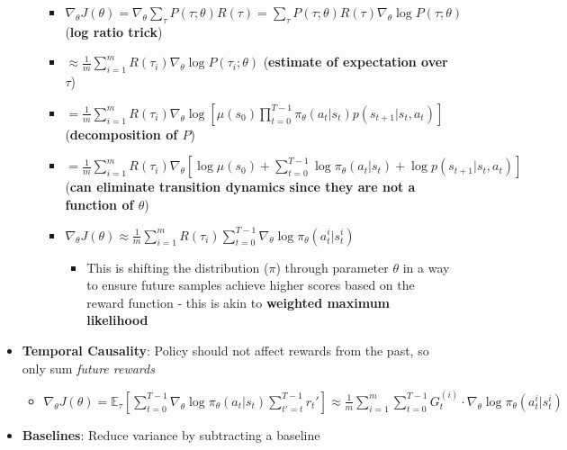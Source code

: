 \documentclass{article}
\providecommand{\tightlist}{%
  \setlength{\itemsep}{\GlobalItemSep}\setlength{\parskip}{\GlobalListParSkip}}
\newlength{\GlobalItemSep}
\newlength{\GlobalListParSkip}
\begin{document}
\begin{multicols}{2}
\begin{itemize}
\begin{itemize}
    \begin{itemize}
    \tightlist
    \item
      \(\nabla_\theta J(\theta) = \nabla_\theta \sum_\tau P(\tau ; \theta) R(\tau) = \sum_\tau P(\tau; \theta) R(\tau) \nabla_\theta \log P(\tau; \theta)\)
      (\textbf{log ratio trick})
    \item
      \(\approx \frac{1}{m}\sum_{i=1}^m R(\tau_i) \nabla_\theta \log P(\tau_i; \theta)\)
      (\textbf{estimate of expectation over \(\tau\)})
    \item
      \(= \frac{1}{m}\sum_{i=1}^m R(\tau_i) \nabla_\theta \log [\mu(s_0) \prod_{t=0}^{T-1} \pi_\theta (a_t | s_t) p(s_{t+1} | s_t, a_t)]\)
      (\textbf{decomposition of \(P\)})
    \item
      \(= \frac{1}{m}\sum_{i=1}^m R(\tau_i) \nabla_\theta [\log \mu(s_0) + \sum_{t=0}^{T-1} \log \pi_\theta (a_t | s_t) + \log p(s_{t+1} | s_t, a_t)]\)
      (\textbf{can eliminate transition dynamics since they are not a
      function of \(\theta\)})
    \item
      \(\nabla_\theta J(\theta) \approx \frac{1}{m} \sum_{i=1}^m R(\tau_i) \sum_{t=0}^{T-1} \nabla_\theta \log \pi_\theta (a^i_t | s^i_t)\)

      \begin{itemize}
      \tightlist
      \item
        This is shifting the distribution (\(\pi\)) through parameter
        \(\theta\) in a way to ensure future samples achieve higher
        scores based on the reward function - this is akin to
        \textbf{weighted maximum likelihood}
      \end{itemize}
    \end{itemize}
  \end{itemize}
\item
  \textbf{Temporal Causality}: Policy should not affect rewards from the
  past, so only sum \emph{future rewards}

  \begin{itemize}
  \tightlist
  \item
    \(\nabla_\theta J(\theta) = \mathbb{E}_\tau [\sum_{t=0}^{T-1} \nabla_\theta \log \pi_\theta (a_t | s_t) \sum_{t' = t}^{T-1} r_t'] \approx \frac{1}{m} \sum_{i=1}^m \sum_{t = 0}^{T-1} G_t^{(i)} \cdot \nabla_\theta \log \pi_\theta (a^i_t | s^i _t)\)
  \end{itemize}
\item
  \textbf{Baselines}: Reduce variance by subtracting a baseline


\end{itemize}
\end{multicols}
\end{document}
